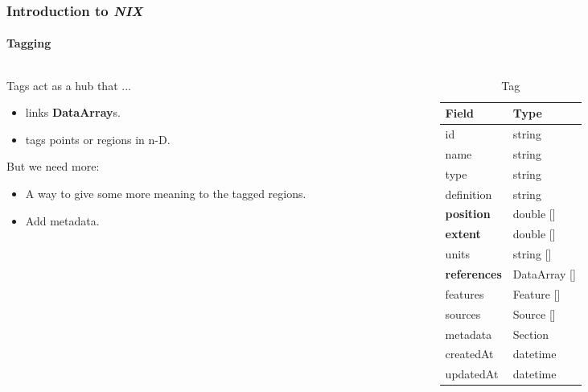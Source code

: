 \documentclass[pdftex, xcolor=table]{beamer}
\newcommand{\nix}{\textit{NIX}}
\newcommand{\dataarray}{\textbf{DataArray}}
\begin{document}
\begin{frame}
  \frametitle{Introduction to \nix{}}
  \framesubtitle{Tagging}
  \begin{columns}
    \begin{column}{5cm}
      Tags act as a hub that ...
      \begin{itemize}
      \item links \dataarray{}s.
      \item tags points or regions in n-D.
      \end{itemize}
      But we need more:
      \begin{itemize}
      \item A way to give some more meaning to the tagged regions.
      \item Add metadata.
      \end{itemize}
    \end{column}
    \begin{column}{6cm}
       \begin{table}[]
        \scriptsize
        \centering
        \captionsetup{labelformat=empty}
        \caption{Tag}
        \begin{tabular}{|l|l|}
          \hline
          \rowcolor[HTML]{EFEFEF} 
          Field                   & Type             \\ \hline
          id                      & string           \\ \hline
          name                    & string           \\ \hline
          type                    & string           \\ \hline
          definition              & string           \\ \hline
          \textbf{position}       & double []        \\ \hline
          \textbf{extent}         & double []        \\ \hline
          units                   & string []        \\ \hline
          \textbf{references}     & DataArray []     \\ \hline
          features                & Feature []       \\ \hline
          sources                 & Source []        \\ \hline
          metadata                & Section          \\ \hline \hline
          createdAt               & datetime         \\ \hline
          updatedAt               & datetime         \\ \hline
        \end{tabular}
      \end{table}
      \normalsize
    \end{column}
  \end{columns}
\end{frame}
\end{document}
